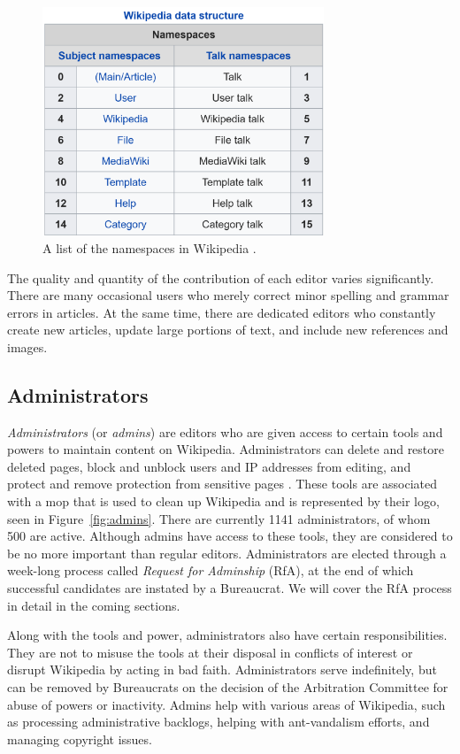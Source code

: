 \begin{figure}[htp]
    \centering
    \includegraphics[width=0.75\textwidth]{images/namespaces.pdf}
    \caption{A list of the namespaces in Wikipedia \cite{wiki:namespace}.}
    \label{fig:namespace}
\end{figure}

The quality and quantity of the contribution of each editor varies significantly.
There are many occasional users who merely correct minor spelling and grammar errors in articles.
At the same time, there are dedicated editors who constantly create new articles, update large portions of text, and include new references and images.   

\subsection{Administrators}
\textit{Administrators} (or \textit{admins}) are editors who are given access to certain tools and powers to maintain content on Wikipedia.
Administrators can delete and restore deleted pages, block and unblock users and IP addresses from editing, and protect and remove protection from sensitive pages \cite{wiki:admins}.
These tools are associated with a mop that is used to clean up Wikipedia and is represented by their logo, seen in Figure~\ref{fig:admins}. 
There are currently 1141 administrators, of whom 500 are active.
Although admins have access to these tools, they are considered to be no more important than regular editors.
Administrators are elected through a week-long process called \textit{Request for Adminship} (RfA), at the end of which successful candidates are instated by a Bureaucrat.
We will cover the RfA process in detail in the coming sections. 

Along with the tools and power, administrators also have certain responsibilities.
They are not to misuse the tools at their disposal in conflicts of interest or disrupt Wikipedia by acting in bad faith.
Administrators serve indefinitely, but can be removed  by Bureaucrats on the decision of the Arbitration Committee for abuse of powers or inactivity.
Admins help with various areas of Wikipedia, such as processing administrative backlogs, helping with ant-vandalism efforts, and managing copyright issues. 


